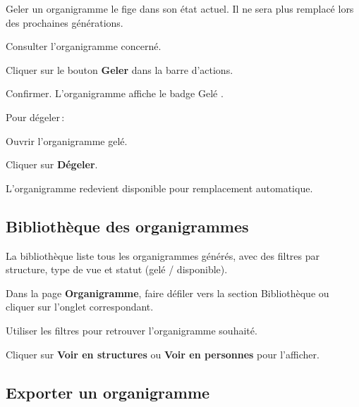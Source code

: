 Geler un organigramme le fige dans son \'etat actuel. Il ne sera plus remplac\'e lors des prochaines g\'en\'erations.

\begin{steps}
  \item Consulter l'organigramme concern\'e.
  \item Cliquer sur le bouton \textbf{Geler} dans la barre d'actions.
  \item Confirmer. L'organigramme affiche le badge \og Gel\'e \fg.
\end{steps}

Pour d\'egeler\,:
\begin{steps}
  \item Ouvrir l'organigramme gel\'e.
  \item Cliquer sur \textbf{D\'egeler}.
  \item L'organigramme redevient disponible pour remplacement automatique.
\end{steps}

\subsection{Biblioth\`eque des organigrammes}

La biblioth\`eque liste tous les organigrammes g\'en\'er\'es, avec des filtres par structure, type de vue et statut (gel\'e / disponible).

\begin{steps}
  \item Dans la page \textbf{Organigramme}, faire d\'efiler vers la section \og Biblioth\`eque \fg{} ou cliquer sur l'onglet correspondant.
  \item Utiliser les filtres pour retrouver l'organigramme souhait\'e.
  \item Cliquer sur \textbf{Voir en structures} ou \textbf{Voir en personnes} pour l'afficher.
\end{steps}


\subsection{Exporter un organigramme}

